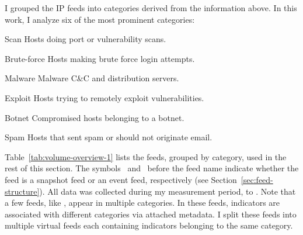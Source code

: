 I grouped the IP feeds into categories derived from the information
above. In this work, I analyze six of the most prominent categories:
%
\begin{categorylist}\small
\item[Scan] Hosts doing port or vulnerability scans.
\item[Brute-force] Hosts making brute force login attempts.
\item[Malware] Malware C\&C and distribution servers.
\item[Exploit] Hosts trying to remotely exploit vulnerabilities.
\item[Botnet] Compromised hosts belonging to a botnet.
\item[Spam] Hosts that sent spam or should not originate email.
\end{categorylist}
%
Table~\ref{tab:volume-overview-1} lists the feeds, grouped by category, used in the
rest of this section. The symbols \snapfeedsym\ and \deltafeedsym\ before the feed
name indicate whether the feed is a snapshot feed or an event feed, respectively
(see Section~\ref{sec:feed-structure}).
All data was collected during my measurement period,
 to . Note that a few
feeds, like {\feedetiprep}, appear in multiple categories. In these feeds, indicators
are associated with different categories via attached metadata. I split these feeds
into multiple virtual feeds each containing indicators belonging to the same category.







